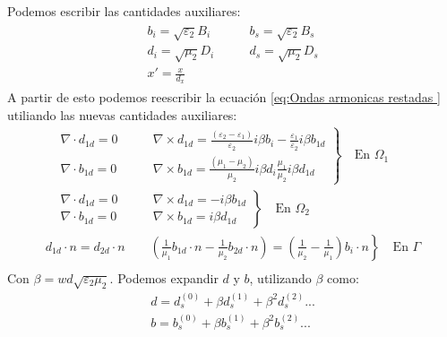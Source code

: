 \documentclass[11pt]{article}
\begin{document}
Podemos escribir las cantidades auxiliares:
\begin{equation}
\begin{gathered}
\begin{aligned}
b_i=\sqrt{\varepsilon_2}B_i &\qquad b_s=\sqrt{\varepsilon_2}B_s\\
d_i=\sqrt{\mu_2}D_i &\qquad d_s=\sqrt{\mu_2}D_s\\
x'=\frac{x}{d_x}
\end{aligned}
\end{gathered}
\end{equation}
A partir de esto podemos reescribir la ecuación \eqref{eq:Ondas armonicas restadas } utiliando las nuevas cantidades auxiliares:
\begin{equation}
\label{eq:Ondas armonicas restadas con cantidades auxiliares}
\begin{split}
\left.
\begin{aligned}
&\nabla\cdot d_{1d}= 0\qquad & \nabla\times d_{1d}= \frac{(\varepsilon_2-\varepsilon_1)}{\varepsilon_2} i\beta b_i-\frac{\varepsilon_1}{\varepsilon_2}i\beta b_{1d}\\
&\nabla\cdot b_{1d} = 0\qquad &  \nabla\times b_{1d}=\frac{(\mu_1-\mu_2)}{\mu_2}i\beta d_i \frac{\mu_1}{\mu_2}i\beta d_{1d}
\end{aligned}
\right\}
\quad\text{En }\Omega_1\\
\left.
\begin{aligned}
&\nabla\cdot d_{1d}= 0\qquad & \nabla\times d_{1d}= -i\beta b_{1d}\\
&\nabla\cdot b_{1d} = 0\qquad &  \nabla\times b_{1d}= i\beta d_{1d}
\end{aligned}
\right\}
\quad\text{En }\Omega_2\\
\left. 
d_{1d}\cdot n=d_{2d}\cdot n \qquad \left(\frac{1}{\mu_1}b_{1d}\cdot n-\frac{1}{\mu_2}b_{2d}\cdot n\right)=\left(\frac{1}{\mu_2}-\frac{1}{\mu_1}\right)b_i\cdot n
\right\}
\quad\text{En }\Gamma\\
\end{split}
\end{equation}
Con $\beta=wd\sqrt{\varepsilon_2\mu_2}$. Podemos expandir $d$ y $b$, utilizando $\beta$ como:
\begin{equation}
\begin{gathered}
d=d_s^{(0)}+\beta d_s^{(1)}+\beta^2 d_s^{(2)}...\\
b=b_s^{(0)}+\beta b_s^{(1)}+\beta^2 b_s^{(2)}...\\
\end{gathered}
\end{equation}
\end{document}

